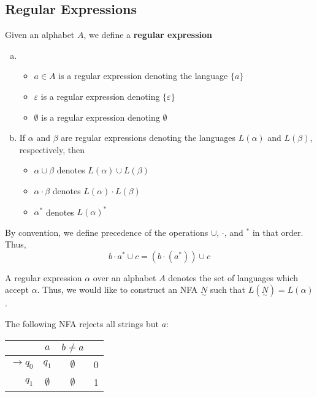\subsection{Regular Expressions}\label{subsubsec:regular-expressions}
\begin{definition}
Given an alphabet \(A\), we define a \textbf{regular expression}
\begin{enumerate}[(a)]
    \item \begin{itemize}
        \item \(a\in A\) is a regular expression denoting the language \( \{a\} \)
        \item \(\varepsilon \) is a regular expression denoting \( \{\varepsilon \} \)
        \item \(\emptyset \) is a regular expression denoting \(\emptyset \)
    \end{itemize}
    
    \item If \(\alpha \) and \(\beta \) are regular expressions denoting the languages \(L(\alpha)\) and \(L(\beta)\), respectively, then 
    \begin{itemize}
        \item \(\alpha\cup\beta \) denotes \(L(\alpha)\cup L(\beta)\)
        \item \(\alpha\cdot\beta \) denotes \(L(\alpha)\cdot L(\beta)\)
        \item \(\alpha^*\) denotes \(L{(\alpha)}^*\)
    \end{itemize}
\end{enumerate}
\end{definition}

By convention, we define precedence of the operations \(\cup \), \(\cdot \), and \(^*\) in that order. Thus, \[b\cdot a^*\cup c=(b\cdot(a^*))\cup c\]

A regular expression \(\alpha \) over an alphabet \(A\) denotes the set of languages which accept \(\alpha \). Thus, we would like to construct an NFA \(\underset{\sim}{N}\) such that \(L(\underset{\sim}{N})=L(\alpha)\).

The following NFA rejects all strings but \(a\):

\begin{center}\begin{tabular}{r c c r}
      & \(a\) & \(b\neq a\) & \\\bottomrule
      \(\to q_0\) & \(q_1\) & \(\emptyset \) & 0\\
            \(q_1\) & \(\emptyset \) & \(\emptyset \) & 1\\
 \end{tabular}\end{center}

